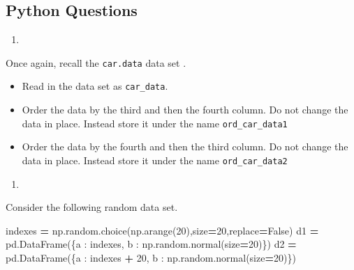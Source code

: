 \documentclass[
  12pt,
  krantz2]{krantz}
\makeatletter
\newenvironment{Shaded}{\begin{snugshade}}{\end{snugshade}}
\newcommand{\DecValTok}[1]{\textcolor[rgb]{0.06,0.06,0.06}{#1}}
\newcommand{\NormalTok}[1]{#1}
\newcommand{\OperatorTok}[1]{\textcolor[rgb]{0.43,0.43,0.43}{\textbf{#1}}}
\newcommand{\StringTok}[1]{\textcolor[rgb]{0.5,0.5,0.5}{#1}}
\newcommand{\VariableTok}[1]{\textcolor[rgb]{0,0,0}{#1}}
\providecommand{\tightlist}{%
  \setlength{\itemsep}{0pt}\setlength{\parskip}{0pt}}
\newenvironment{kframe}{%
\medskip{}
\setlength{\fboxsep}{.8em}
 \def\at@end@of@kframe{}%
 \ifinner\ifhmode%
  \def\at@end@of@kframe{\end{minipage}}%
  \begin{minipage}{\columnwidth}%
 \fi\fi%
 \def\FrameCommand##1{\hskip\@totalleftmargin \hskip-\fboxsep
 \colorbox{shadecolor}{##1}\hskip-\fboxsep
     \hskip-\linewidth \hskip-\@totalleftmargin \hskip\columnwidth}%
 \MakeFramed {\advance\hsize-\width
   \@totalleftmargin\z@ \linewidth\hsize
   \@setminipage}}%
 {\par\unskip\endMakeFramed%
 \at@end@of@kframe}
\renewenvironment{Shaded}{\begin{kframe}}{\end{kframe}}
\makeatother
\begin{document}
\hypertarget{python-questions-9}{%
\subsection{Python Questions}\label{python-questions-9}}

\begin{enumerate}
\def\labelenumi{\arabic{enumi}.}
\tightlist
\item
\end{enumerate}

Once again, recall the \texttt{car.data} data set \citep{misc_car_evaluation_19}.

\begin{itemize}
\tightlist
\item
  Read in the data set as \texttt{car\_data}.
\item
  Order the data by the third and then the fourth column. Do not change the data in place. Instead store it under the name \texttt{ord\_car\_data1}
\item
  Order the data by the fourth and then the third column. Do not change the data in place. Instead store it under the name \texttt{ord\_car\_data2}
\end{itemize}

\begin{enumerate}
\def\labelenumi{\arabic{enumi}.}
\setcounter{enumi}{1}
\tightlist
\item
\end{enumerate}

Consider the following random data set.

\begin{Shaded}
\begin{Highlighting}[]
\NormalTok{indexes  }\OperatorTok{=}\NormalTok{ np.random.choice(np.arange(}\DecValTok{20}\NormalTok{),size}\OperatorTok{=}\DecValTok{20}\NormalTok{,replace}\OperatorTok{=}\VariableTok{False}\NormalTok{)}
\NormalTok{d1 }\OperatorTok{=}\NormalTok{ pd.DataFrame(\{}\StringTok{\textquotesingle{}a\textquotesingle{}}\NormalTok{ : indexes, }
                        \StringTok{\textquotesingle{}b\textquotesingle{}}\NormalTok{ : np.random.normal(size}\OperatorTok{=}\DecValTok{20}\NormalTok{)\})}
\NormalTok{d2 }\OperatorTok{=}\NormalTok{ pd.DataFrame(\{}\StringTok{\textquotesingle{}a\textquotesingle{}}\NormalTok{ : indexes }\OperatorTok{+} \DecValTok{20}\NormalTok{, }
                        \StringTok{\textquotesingle{}b\textquotesingle{}}\NormalTok{ : np.random.normal(size}\OperatorTok{=}\DecValTok{20}\NormalTok{)\})}
\end{Highlighting}
\end{Shaded}
\end{document}
